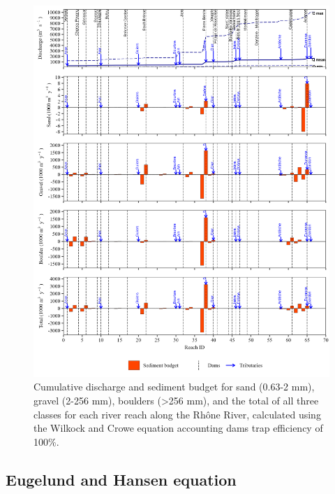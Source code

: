 \documentclass[
]{book}
\begin{document}
\begin{figure}
\includegraphics[width=26.24in]{img/res_cascade/res_E3_eW&C/plots_sed_budget-silt/sed_bud_res_sum_hy_E3_eW&C} \caption{Cumulative discharge and sediment budget for sand (0.63-2 mm), gravel (2-256 mm), boulders (>256 mm), and the total of all three classes for each river reach along the Rhône River, calculated using the Wilkock and Crowe equation accounting dams trap efficiency of 100\%.}\label{fig:budgetE3eW}
\end{figure}

\subsection{Eugelund and Hansen equation}\label{eugelund-and-hansen-equation-1}
\end{document}
